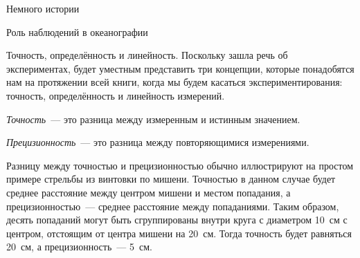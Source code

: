 \begin{chapter}{Немного истории}
\begin{section}{Роль наблюдений в океанографии}
\begin{paragraph}{Точность, определённость и линейность.}
Поскольку зашла речь об экспериментах, будет уместным представить 
три концепции, которые понадобятся нам на протяжении всей книги, 
когда мы будем касаться экспериментирования: точность, определённость 
и линейность измерений.
%

\emph{Точность}~--- это разница между измеренным и истинным значением.
%

\emph{Прецизионность}~--- это разница между повторяющимися измерениями.

Разницу между точностью и прецизионностью обычно иллюстрируют на
простом примере стрельбы из винтовки по мишени. Точностью в данном случае 
будет среднее расстояние между центром мишени и местом попадания, 
а прецизионностью~--- среднее расстояние между попаданиями. 
Таким образом, десять попаданий
могут быть сгруппированы внутри круга с диаметром 10~см с центром,
отстоящим от центра мишени на 20~см. Тогда точность будет равняться 20~см, 
а прецизионность~--- 5~см.
%



\end{paragraph}
\end{section}
\end{chapter}
